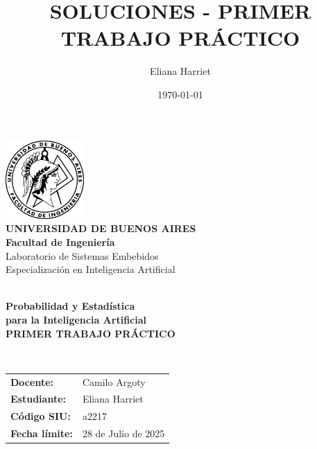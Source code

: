 \documentclass[11pt,a4paper]{article}
\title{SOLUCIONES - PRIMER TRABAJO PRÁCTICO}
\author{Eliana Harriet}
\date{\today}
\begin{document}
\begin{titlepage}
    \centering
    
    \vspace*{0.5cm}
    
    \includegraphics[width=3cm]{../../assets/Logo-fiuba_big.png}\\[0.5cm]
    
    {\color{ubaazul}\Large \textbf{UNIVERSIDAD DE BUENOS AIRES}}\\[0.2cm]
    {\color{ubaazul}\large \textbf{Facultad de Ingeniería}}\\[0.1cm]
    {\color{ubagris}\normalsize Laboratorio de Sistemas Embebidos}\\[0.1cm]
    {\color{ubagris}\normalsize Especialización en Inteligencia Artificial}\\[0.3cm]
    
    \rule{0cm}{0.5pt}\\[0.5cm]
    
    {\color{ubaazul}\Large \textbf{Probabilidad y Estadística}}\\[0.2cm]
    {\color{ubaazul}\Large \textbf{para la Inteligencia Artificial}}\\[0.8cm]
    
    {\Large \textbf{PRIMER TRABAJO PRÁCTICO}}\\[0.5cm]
    
    \rule{0cm}{0.5pt}\\[1cm]
    
    \begin{tabular}{@{}p{4cm}p{7cm}@{}}
        \textbf{Docente:} & Camilo Argoty \\[0.4cm]
        \textbf{Estudiante:} & Eliana Harriet \\[0.4cm]
        \textbf{Código SIU:} & a2217 \\[0.4cm]
        \textbf{Fecha límite:} & 28 de Julio de 2025 \\[0.4cm]
    \end{tabular}
    
    \vfill
    
\end{titlepage}
\end{document}
